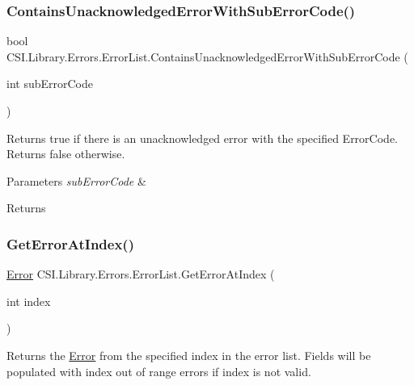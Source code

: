 \subsubsection{\texorpdfstring{ContainsUnacknowledgedErrorWithSubErrorCode()}{ContainsUnacknowledgedErrorWithSubErrorCode()}}
{\footnotesize\ttfamily bool C\+S\+I.\+Library.\+Errors.\+Error\+List.\+Contains\+Unacknowledged\+Error\+With\+Sub\+Error\+Code (\begin{DoxyParamCaption}\item[{int}]{sub\+Error\+Code }\end{DoxyParamCaption})\hspace{0.3cm}{\ttfamily [inline]}}



Returns true if there is an unacknowledged error with the specified Error\+Code. Returns false otherwise. 


\begin{DoxyParams}{Parameters}
{\em sub\+Error\+Code} & \\
\hline
\end{DoxyParams}
\begin{DoxyReturn}{Returns}

\end{DoxyReturn}
\mbox{\label{class_c_s_i_1_1_library_1_1_errors_1_1_error_list_aefb5a63d694f8e006e9451eacc7a85c6}} 
\subsubsection{\texorpdfstring{GetErrorAtIndex()}{GetErrorAtIndex()}}
{\footnotesize\ttfamily \mbox{\hyperlink{class_c_s_i_1_1_library_1_1_errors_1_1_error}{Error}} C\+S\+I.\+Library.\+Errors.\+Error\+List.\+Get\+Error\+At\+Index (\begin{DoxyParamCaption}\item[{int}]{index }\end{DoxyParamCaption})\hspace{0.3cm}{\ttfamily [inline]}}



Returns the \mbox{\hyperlink{class_c_s_i_1_1_library_1_1_errors_1_1_error}{Error}} from the specified index in the error list. Fields will be populated with index out of range errors if index is not valid. 

